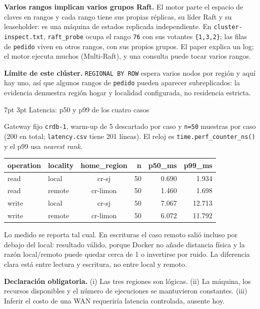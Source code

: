 \documentclass[10pt,letterpaper]{article}
\makeatletter
\renewcommand\section{\@startsection{section}{1}{\z@}%
  {7pt \@plus 2pt \@minus 1pt}{3pt}%
  {\normalfont\normalsize\bfseries\color{acc}}}
\makeatother
\begin{document}
\textbf{Varios rangos implican varios grupos Raft.} El motor parte el espacio de claves en rangos y
cada rango tiene sus propias réplicas, su líder Raft y su leaseholder: es una máquina de estados
replicada independiente. En \texttt{cluster-inspect.txt}, \texttt{raft\_probe} ocupa el rango
\texttt{76} con sus votantes \texttt{\{1,3,2\}}; las filas de \texttt{pedido} viven en otros rangos,
con sus propios grupos. El paper explica un log; el motor ejecuta muchos (Multi-Raft), y una
consulta puede tocar varios rangos.

\textbf{Límite de este clúster.} \texttt{REGIONAL BY ROW} espera varios nodos por región y aquí hay
uno, así que algunos rangos de \texttt{pedido} pueden aparecer subreplicados: la evidencia demuestra
región hogar y localidad configurada, no residencia estricta.

\section{Latencia: p50 y p99 de los cuatro casos}

Gateway fijo \texttt{crdb-1}, warm-up de 5 descartado por caso y \texttt{n=50} muestras por caso
(200 en total; \texttt{latency.csv} tiene 201 líneas). El reloj es
\texttt{time.perf\_counter\_ns()} y el p99 usa \emph{nearest rank}.

\begin{center}\footnotesize
\begin{tabular}{@{}llcrrr@{}}
\toprule
\textbf{operation} & \textbf{locality} & \textbf{home\_region} & \textbf{n} & \textbf{p50\_ms} & \textbf{p99\_ms} \\
\midrule
read  & local  & cr-sj    & 50 & 0.690 & 1.934 \\
read  & remote & cr-limon & 50 & 1.460 & 1.698 \\
write & local  & cr-sj    & 50 & 7.067 & 12.713 \\
write & remote & cr-limon & 50 & 6.072 & 11.792 \\
\bottomrule
\end{tabular}
\end{center}

Lo medido se reporta tal cual. En escrituras el caso remoto salió incluso por debajo del local:
resultado válido, porque Docker no añade distancia física y la razón local/remoto puede quedar cerca
de 1 o invertirse por ruido. La diferencia clara está entre lectura y escritura, no entre local y
remoto.

\textbf{Declaración obligatoria.} (i) Las tres regiones son lógicas. (ii) La máquina, los recursos
disponibles y el número de ejecuciones se mantuvieron constantes. (iii) Inferir el costo de una WAN
requeriría latencia controlada, ausente hoy.
\end{document}
